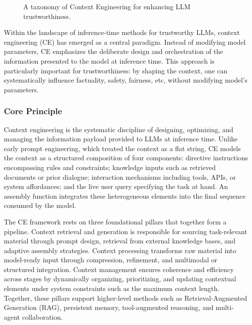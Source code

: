 \begin{figure}[htbp]
{%
    }
    \caption{A taxonomy of Context Engineering for enhancing LLM trustworthiness.}
    \label{fig:ce_taxonomy}
\end{figure}

Within the landscape of inference-time methods for trustworthy LLMs, context engineering (CE) has emerged as a central paradigm. Instead of modifying model parameters, CE emphasizes the deliberate design and orchestration of the information presented to the model at inference time. This approach is particularly important for trustworthiness: by shaping the context, one can systematically influence factuality, safety, fairness, etc, without modifying model's parameters.

\subsubsection{Core Principle}

Context engineering is the systematic discipline of designing, optimizing, and managing the information payload provided to LLMs at inference time. Unlike early prompt engineering, which treated the context as a flat string, CE models the context as a structured composition of four components: directive instructions encompassing rules and constraints; knowledge inputs such as retrieved documents or prior dialogue; interaction mechanisms including tools, APIs, or system affordances; and the live user query specifying the task at hand. An assembly function integrates these heterogeneous elements into the final sequence consumed by the model.

The CE framework rests on three foundational pillars that together form a pipeline. Context retrieval and generation is responsible for sourcing task-relevant material through prompt design, retrieval from external knowledge bases, and adaptive assembly strategies. Context processing transforms raw material into model-ready input through compression, refinement, and multimodal or structured integration. Context management ensures coherence and efficiency across stages by dynamically organizing, prioritizing, and updating contextual elements under system constraints such as the maximum context length. Together, these pillars support higher-level methods such as Retrieval-Augmented Generation (RAG), persistent memory, tool-augmented reasoning, and multi-agent collaboration.


